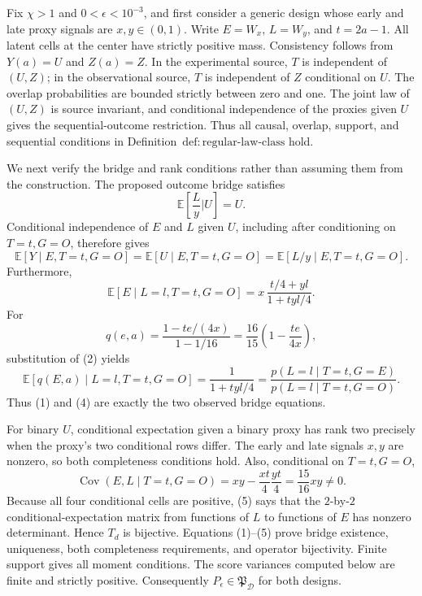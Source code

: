 Fix \(\chi>1\) and \(0<\epsilon<10^{-3}\), and first consider a generic design whose early and late proxy signals are \(x,y\in(0,1)\).  Write \(E=W_x\), \(L=W_y\), and \(t=2a-1\).  All latent cells at the center have strictly positive mass.  Consistency follows from \(Y(a)=U\) and \(Z(a)=Z\).  In the experimental source, \(T\) is independent of \((U,Z)\); in the observational source, \(T\) is independent of \(Z\) conditional on \(U\).  The overlap probabilities are bounded strictly between zero and one.  The joint law of \((U,Z)\) is source invariant, and conditional independence of the proxies given \(U\) gives the sequential-outcome restriction.  Thus all causal, overlap, support, and sequential conditions in Definition~\(\mathrm{def{:}regular\text{-}law\text{-}class}\) hold.

We next verify the bridge and rank conditions rather than assuming them from the construction.  The proposed outcome bridge satisfies
\[
 \mathbb E\!\left[\frac{L}{y}\mathrel{\Big|}U\right]=U.
\]
Conditional independence of \(E\) and \(L\) given \(U\), including after conditioning on \(T=t,G=O\), therefore gives
\[
 \mathbb E[Y\mid E,T=t,G=O]
 =\mathbb E[U\mid E,T=t,G=O]
 =\mathbb E[L/y\mid E,T=t,G=O].                       \tag{1}
\]
Furthermore,
\[
 \mathbb E[E\mid L=l,T=t,G=O]
 =x\,\frac{t/4+yl}{1+tyl/4}.                           \tag{2}
\]
For
\[
 q(e,a)=\frac{1-te/(4x)}{1-1/16}=\frac{16}{15}
       \left(1-\frac{te}{4x}\right),                   \tag{3}
\]
substitution of (2) yields
\[
 \mathbb E[q(E,a)\mid L=l,T=t,G=O]
 =\frac{1}{1+tyl/4}
 =\frac{p(L=l\mid T=t,G=E)}{p(L=l\mid T=t,G=O)}.       \tag{4}
\]
Thus (1) and (4) are exactly the two observed bridge equations.

For binary \(U\), conditional expectation given a binary proxy has rank two precisely when the proxy's two conditional rows differ.  The early and late signals \(x,y\) are nonzero, so both completeness conditions hold.  Also, conditional on \(T=t,G=O\),
\[
 \operatorname{Cov}(E,L\mid T=t,G=O)
 =xy-\frac{xt}{4}\frac{yt}{4}=\frac{15}{16}xy\ne0.    \tag{5}
\]
Because all four conditional cells are positive, (5) says that the \(2\)-by-\(2\) conditional-expectation matrix from functions of \(L\) to functions of \(E\) has nonzero determinant.  Hence \(T_d\) is bijective.  Equations (1)--(5) prove bridge existence, uniqueness, both completeness requirements, and operator bijectivity.  Finite support gives all moment conditions.  The score variances computed below are finite and strictly positive.  Consequently \(P_\epsilon\in\mathfrak P_{\mathcal D}\) for both designs.


